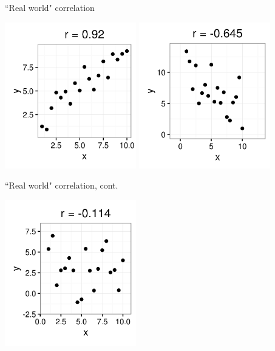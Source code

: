 \documentclass[xcolor=table, aspectratio=169, bigger, handout]{beamer}
\begin{document}
\begin{frame}{``Real world" correlation}

{\centering
\includegraphics[width=2.25in]{../images/ch10_cor_pos3}
\pause\includegraphics[width=2.25in]{../images/ch10_cor_neg3}
\par}
\end{frame}

\begin{frame}{``Real world" correlation, cont.}

{\centering
\includegraphics[width=2.25in]{../images/ch10_cor_zero2}
\par}
\end{frame}
\end{document}
